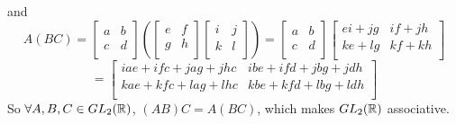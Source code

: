 \documentclass[12pt]{article}
\begin{document}
    and 
    \[ A(BC) =
    \begin{bmatrix}
    a & b \\
    c & d \\
    \end{bmatrix}
    \left( \begin{bmatrix}
    e & f \\
    g & h \\
    \end{bmatrix}
    \begin{bmatrix}
    i & j \\
    k & l \\
    \end{bmatrix} \right)
    = \begin{bmatrix}
    a & b \\
    c & d \\
    \end{bmatrix}
    \begin{bmatrix}
    ei + jg & if + jh \\
    ke + lg & kf + kh \\
    \end{bmatrix} \]
    \[ = \begin{bmatrix}
    iae + ifc + jag + jhc & ibe + ifd + jbg + jdh \\
    kae + kfc + lag + lhc & kbe + kfd + lbg + ldh \\
    \end{bmatrix} \]
    So $\forall A, B, C \in GL_2(\mathbb{R})$, $(AB)C = A(BC)$,
    which makes $GL_2(\mathbb{R})$ associative.
\end{document}
